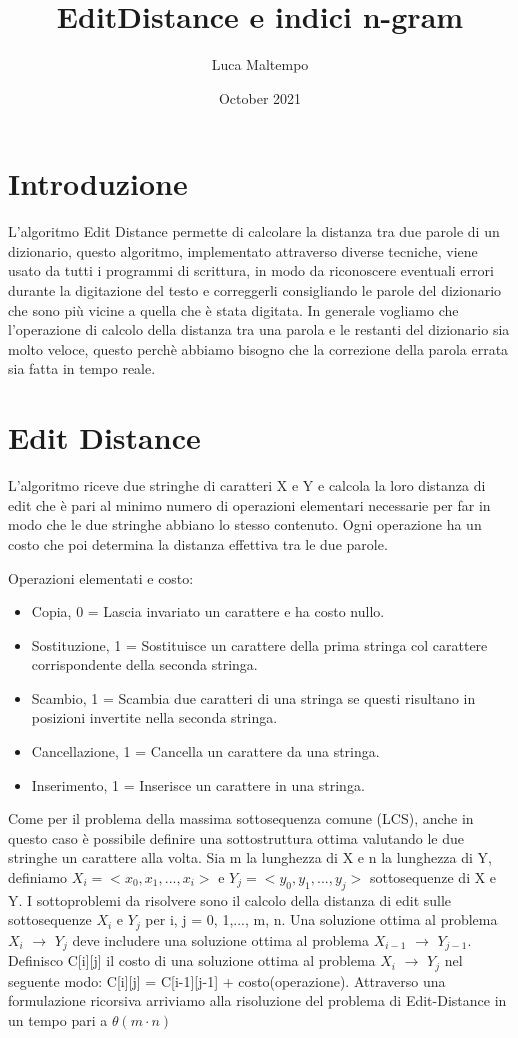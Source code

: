 \documentclass{article}
\title{EditDistance e indici n-gram}
\author{Luca Maltempo}
\date{October 2021}
\begin{document}
\maketitle

\section{Introduzione}
L'algoritmo Edit Distance permette di calcolare la distanza tra due parole di un dizionario, questo algoritmo, implementato attraverso diverse tecniche, viene usato da tutti i programmi di scrittura, in modo  da riconoscere eventuali errori durante la digitazione del testo e correggerli consigliando le parole del dizionario che sono più vicine a quella che è stata digitata. In generale vogliamo che l'operazione di calcolo della distanza tra una parola e le restanti del dizionario sia molto veloce, questo perchè abbiamo bisogno che la correzione della parola errata sia fatta in tempo reale.
\section{Edit Distance}
L'algoritmo riceve due stringhe di caratteri X e Y e calcola la loro distanza di edit che è pari al minimo numero di operazioni elementari necessarie per far in modo che le due stringhe abbiano lo stesso contenuto. Ogni operazione ha un costo che poi determina la distanza effettiva tra le due parole.

Operazioni elementati e costo:
\begin{itemize}
    \item Copia, 0 = Lascia invariato un carattere e ha costo nullo.
    \item Sostituzione, 1 = Sostituisce un carattere della prima stringa col carattere corrispondente della seconda stringa. 
    \item Scambio, 1 = Scambia due caratteri di una stringa se questi risultano in posizioni invertite nella seconda stringa. 
    \item Cancellazione, 1 = Cancella un carattere da una stringa.
    \item Inserimento, 1 = Inserisce un carattere in una stringa.
\end{itemize}
Come per il problema della massima sottosequenza comune (LCS), anche in questo caso è possibile definire una sottostruttura ottima valutando le due stringhe un carattere alla volta. Sia m la lunghezza di X e n la lunghezza di Y, definiamo $X_{i}= < x_{0}, x_{1},...,x_{i} >$ e  $Y_{j}= < y_{0}, y_{1},...,y_{j} >$ sottosequenze di X e Y.
I sottoproblemi da risolvere sono il calcolo della distanza di edit sulle sottosequenze $X_{i}$ e $Y_{j}$ per i, j = 0, 1,..., m, n.
Una soluzione ottima al problema $X_{i}$ $\rightarrow$ $Y_{j}$ deve includere una soluzione ottima al problema $X_{i-1}$ $\rightarrow$ $Y_{j-1}$. Definisco C[i][j] il costo di una soluzione ottima al problema $X_{i}$ $\rightarrow$ $Y_{j}$ nel seguente modo: C[i][j] = C[i-1][j-1] + costo(operazione). Attraverso una formulazione ricorsiva arriviamo alla risoluzione del problema di Edit-Distance in un tempo pari a $\theta(m \cdot n)$ %
\end{document}
